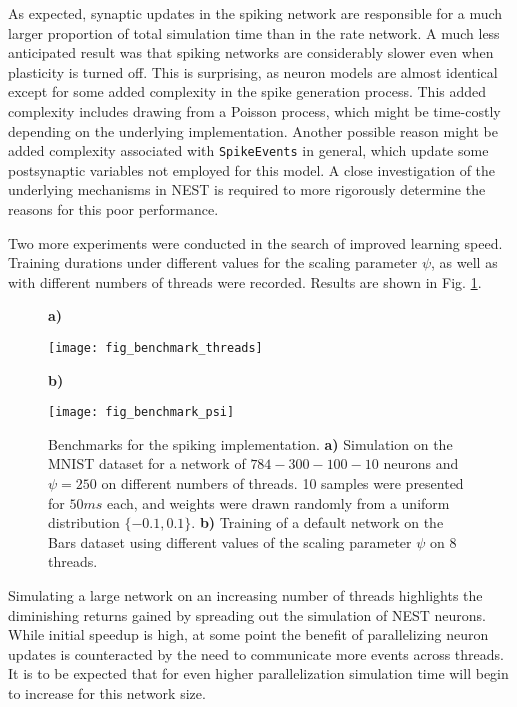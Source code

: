 As expected, synaptic updates in the spiking network are responsible for a much larger proportion of total simulation
time than in the rate network. A much less anticipated result was that spiking networks are considerably slower even
when plasticity is turned off. This is surprising, as neuron models are almost identical except for some added
complexity in the spike generation process. This added complexity includes drawing from a Poisson process, which might
be time-costly depending on the underlying implementation. Another possible reason might be added complexity associated
with \texttt{SpikeEvents} in general, which update some postsynaptic variables not employed for this model. A close
investigation of the underlying mechanisms in NEST is required to more rigorously determine the reasons for this poor
performance.

\noindent Two more experiments were conducted in the search of improved learning speed. Training durations under
different values for the scaling parameter $\psi$, as well as with different numbers of threads were recorded. Results
are shown in Fig. \ref{fig-benchmark-threads-psi}.

\begin{figure}[h]
    \centering
    \begin{minipage}{0.5\textwidth}
        \textbf{a)}\par\medskip
        \centering
        \texttt{[image: fig\_benchmark\_threads]}
    \end{minipage}\hfill
    \begin{minipage}{0.5\textwidth}
        \textbf{b)}\par\medskip
        \centering
        \texttt{[image: fig\_benchmark\_psi]}
    \end{minipage}
    \caption[Benchmarks for the spiking implementation]{Benchmarks for the spiking implementation. \textbf{a)}
        Simulation on the MNIST dataset for a network of $784-300-100-10$ neurons and $\psi=250$ on different numbers of
        threads. 10 samples were presented for $50ms$ each, and weights were drawn randomly from a uniform distribution
        $ \{-0.1, 0.1\}$. \textbf{b)} Training of a default network on the Bars dataset using different values of the
        scaling parameter $\psi$ on 8 threads.}
    \label{fig-benchmark-threads-psi}
\end{figure}

Simulating a large network on an increasing number of threads highlights the diminishing returns gained by spreading out
the simulation of NEST neurons. While initial speedup is high, at some point the benefit of parallelizing neuron updates
is counteracted by the need to communicate more events across threads. It is to be expected that for even higher
parallelization simulation time will begin to increase for this network size.

